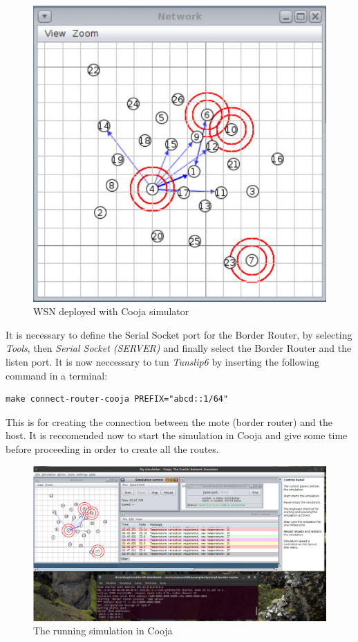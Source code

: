 \documentclass[10pt,english, openany]{book}
\begin{document}
\begin{figure}[h]
\centering
\includegraphics[scale=0.4]{network.png}
\caption{WSN deployed with Cooja simulator}
\end{figure}

It is necessary to define the Serial Socket port for the Border Router, by selecting \textit{Tools}, then \textit{Serial Socket (SERVER)} and finally select the Border Router and the listen port.
It is now neccessary to tun \textit{Tunslip6} by inserting the following command in a terminal:
\begin{lstlisting}
make connect-router-cooja PREFIX="abcd::1/64"
\end{lstlisting}
This is for creating the connection between the mote (border router) and the host.
It is reccomended now to start the simulation in Cooja and give some time before proceeding in order to create all the routes.

\begin{figure}[H]
\centering
\includegraphics[scale=0.2]{simulation.png}
\caption{The running simulation in Cooja}
\end{figure}
\end{document}
